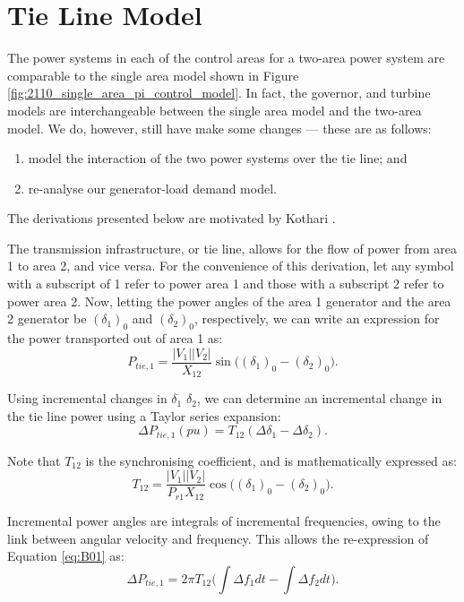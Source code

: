 \section{Tie Line Model}
The power systems in each of the control areas for a two-area power system are comparable to the single area model shown in Figure \ref{fig:2110_single_area_pi_control_model}. In fact, the governor, and turbine models are interchangeable between the single area model and the two-area model. We do, however, still have make some changes --- these are as follows:
\begin{enumerate}
	\item model the interaction of the two power systems over the tie line; and
	\item re-analyse our generator-load demand model.
\end{enumerate}

The derivations presented below are motivated by Kothari \cite{Kothari2011}.

The transmission infrastructure, or tie line, allows for the flow of power from area 1 to area 2, and vice versa. For the convenience of this derivation, let any symbol with a subscript of 1 refer to power area 1 and those with a subscript 2 refer to power area 2. Now, letting the power angles of the area 1 generator and the area 2 generator be $(\delta_1)_0$ and $(\delta_2)_0$, respectively, we can write an expression for the power transported out of area 1 as:
\begin{equation}
	P_{tie, 1} = \frac{|V_1||V_2|}{X_{12}} \sin \big( (\delta_1)_0 - (\delta_2)_0 \big).
\end{equation}

Using incremental changes in $\delta_1$ $\delta_2$, we can determine an incremental change in the tie line power using a Taylor series expansion:
\begin{equation}
	\Delta P_{tie, 1}(pu) = T_{12} (\Delta \delta_1 - \Delta \delta_2). \label{eq:B01}
\end{equation}

Note that $T_{12}$ is the synchronising coefficient, and is mathematically expressed as:
\begin{equation}
	T_{12} = \frac{|V_1||V_2|}{P_{r1} X_{12}} \cos \big( (\delta_1)_0 - (\delta_2)_0 \big).
\end{equation}

Incremental power angles are integrals of incremental frequencies, owing to the link between  angular velocity and frequency. This allows the re-expression of Equation \ref{eq:B01} as:
\begin{equation}
	\Delta P_{tie, 1} = 2 \pi T_{12} \bigg( \int \Delta f_1 dt - \int \Delta f_2 dt \bigg). \label{eq:B02}
\end{equation}

